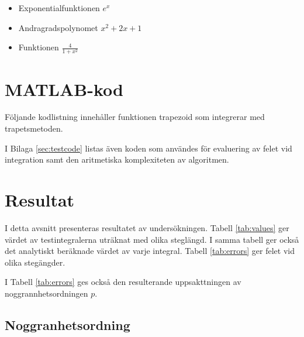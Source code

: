 \documentclass[a4paper,titlepage]{article}
\begin{document}
\begin{itemize}
    \item Exponentialfunktionen $e^x$
    \item Andragradspolynomet $x^2 + 2x + 1$
    \item Funktionen $\frac{4}{1 + x^2}$
\end{itemize}

\section{MATLAB-kod}

Följande kodlistning innehåller funktionen trapezoid som integrerar med trapetsmetoden.



I Bilaga \ref{sec:testcode} listas även koden som användes för evaluering av
felet vid integration samt den aritmetiska komplexiteten av algoritmen.



\section{Resultat}

I detta avsnitt presenteras resultatet av undersökningen. Tabell \ref{tab:values}
ger värdet av testintegralerna uträknat med olika steglängd. I samma tabell ger också
det analytiskt beräknade värdet av varje integral. Tabell \ref{tab:errors}
ger felet vid olika stegängder.

I Tabell \ref{tab:errors} ges också den resulterande uppsakttningen av noggrannhetsordningen
$p$.



\subsection{Noggranhetsordning}
\end{document}
